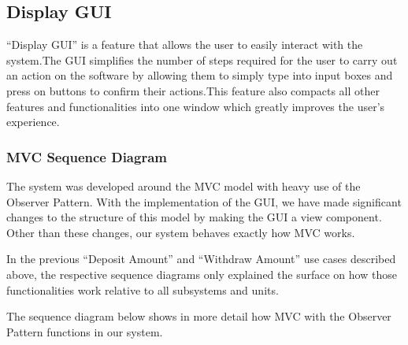 \documentclass[12pt]{article}
\begin{document}
\subsection{Display GUI}
“Display GUI” is a feature that allows the user to easily interact with the system.The GUI simplifies the number of steps required for the user to carry out an action on the software by allowing them to simply type into input boxes and press on buttons to confirm their actions.This feature also compacts all other features and functionalities into one window which greatly improves the user’s experience. 

\subsubsection{MVC Sequence Diagram}

The system was developed around the MVC model with heavy use of the Observer Pattern. With the implementation of the GUI, we have made significant changes to the structure of this model by making the GUI a view component. Other than these changes, our system behaves exactly how MVC works. 

In the previous “Deposit Amount” and “Withdraw Amount” use cases described above, the respective sequence diagrams only explained the surface on how those functionalities work relative to all subsystems and units.

The sequence diagram below shows in more detail how MVC with the Observer Pattern functions in our system.    
\end{document}

